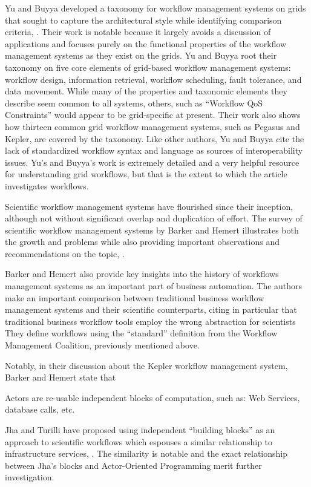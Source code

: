 Yu and Buyya developed a taxonomy for workflow management systems on
grids that sought to capture the architectural style while identifying
comparison criteria, \cite{yu_taxonomy_2005}. Their work is notable because it
largely avoids a discussion of applications and focuses purely on the
functional properties of the workflow management systems as they exist
on the grids. Yu and Buyya root their taxonomy on five core elements of
grid-based workflow management systems: workflow design, information
retrieval, workflow scheduling, fault tolerance, and data movement.
While many of the properties and taxonomic elements they describe seem
common to all systems, others, such as ``Workflow QoS Constraints''
would appear to be grid-specific at present. Their work also shows how
thirteen common grid workflow management systems, such as Pegasus and
Kepler, are covered by the taxonomy. Like other authors, Yu and Buyya
cite the lack of standardized workflow syntax and language as sources of
interoperability issues. Yu's and Buyya's work is extremely detailed and
a very helpful resource for understanding grid workflows, but that is
the extent to which the article investigates workflows.

Scientific workflow management systems have flourished since their
inception, although not without significant overlap and duplication of
effort. The survey of scientific workflow management systems by Barker
and Hemert illustrates both the growth and problems while also providing
important observations and recommendations on the topic,
\cite{barker_scientific_2007}.

Barker and Hemert also provide key insights into the history of
workflows management systems as an important part of business
automation. The authors make an important comparison between traditional
business workflow management systems and their scientific counterparts,
citing in particular that traditional business workflow tools employ the
wrong abstraction for scientists They define workflows using the
``standard'' definition from the Workflow Management Coalition,
previously mentioned above.

Notably, in their discussion about the Kepler workflow management
system, Barker and Hemert state that

\begin{displayquote}
Actors are re-usable independent blocks of computation, such as:
Web Services, database calls, etc.
\end{displayquote}

Jha and Turilli have proposed using independent ``building blocks'' as
an approach to scientific workflows which espouses a similar
relationship to infrastructure services, \cite{jha_building_2016}. The
similarity is notable and the exact relationship between Jha's blocks and
Actor-Oriented Programming merit further investigation.

